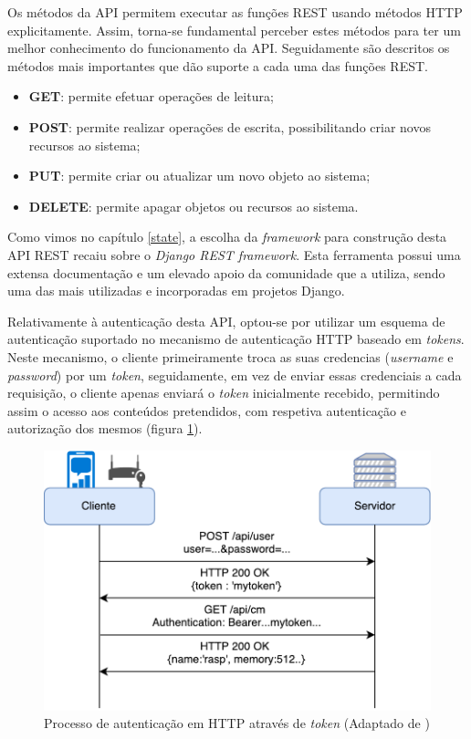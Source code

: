 Os métodos da API permitem executar as funções \ac{REST} usando métodos \ac{HTTP} explicitamente. Assim, torna-se fundamental perceber estes métodos para ter um melhor conhecimento do funcionamento da \ac{API}. Seguidamente são descritos os métodos mais importantes que dão suporte a cada uma das funções \ac{REST}.


\begin{itemize}
	\item \textbf{GET}: permite efetuar operações de leitura;
	\item \textbf{POST}: permite realizar operações de escrita, possibilitando criar novos recursos ao sistema;
	\item \textbf{PUT}: permite criar ou atualizar um novo objeto ao sistema;  
	\item \textbf{DELETE}: permite apagar objetos ou recursos ao sistema. 
\end{itemize}




Como vimos no capítulo \ref{state}, a escolha da \textit{framework} para construção desta \ac{API} \ac{REST} recaiu sobre o \textit{Django REST framework}. Esta ferramenta possui uma extensa documentação e um elevado apoio da comunidade que a utiliza, sendo uma das mais utilizadas e incorporadas em projetos Django. 

Relativamente à autenticação desta \ac{API}, optou-se por utilizar um esquema de autenticação suportado no mecanismo de autenticação \ac{HTTP} baseado em \textit{tokens}\cite{tokenREST}. Neste mecanismo, o cliente primeiramente troca as suas credencias (\textit{username} e \textit{password}) por um \textit{token}, seguidamente, em vez de enviar essas credenciais a cada requisição, o cliente apenas enviará o \textit{token} inicialmente recebido, permitindo assim o acesso aos conteúdos pretendidos, com respetiva autenticação e autorização dos mesmos (figura \ref{autnetAPI}).


\begin{figure}[h]
	\centering
	\includegraphics[scale=0.61]{esquemas/autenticacaohttpesquema.pdf}
	\caption[Processo de autenticação em \acs{HTTP} através de \textit{token}]{Processo de autenticação em \ac{HTTP} através de \textit{token} (Adaptado de \cite{AdoKukic2016})}
	\label{autnetAPI}
\end{figure}


